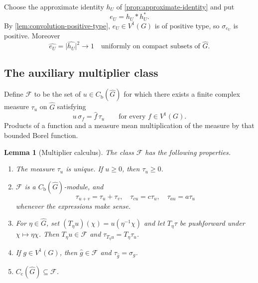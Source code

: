 \documentclass[11pt]{article}
\newtheorem{lemma}[theorem]{Lemma}
\theoremstyle{definition}
\theoremstyle{remark}
\newcommand{\Cc}{C_{\mathrm c}}
\newcommand{\Cb}{C_{\mathrm b}}
\newcommand{\dual}[1]{\widehat{#1}}
\newcommand{\abs}[1]{\lvert #1\rvert}
\begin{document}
Choose the approximate identity $h_U$ of \cref{prop:approximate-identity} and put
\begin{equation}
  e_U=h_U*h_U^*.
  \label{eq:positive-approx-identity}
\end{equation}
By \cref{lem:convolution-positive-type}, $e_U\in V^1(G)$ is of positive type, so
$\sigma_{e_U}$ is positive.  Moreover
\begin{equation}
 \widehat{e_U}=\abs{\widehat{h_U}}^2\longrightarrow1
 \quad\text{uniformly on compact subsets of }\dual G.
 \label{eq:positive-approx-transform}
\end{equation}

\subsection{The auxiliary multiplier class}

Define $\mathcal F$ to be the set of $u\in\Cb(\dual G)$ for which there exists a finite
complex measure $\tau_u$ on $\dual G$ satisfying
\begin{equation}
  u\,\sigma_f=\widehat f\,\tau_u
  \qquad\text{for every }f\in V^1(G).
  \label{eq:F-defining}
\end{equation}
Products of a function and a measure mean multiplication of the measure by that bounded
Borel function.

\begin{lemma}[Multiplier calculus]
\label{lem:multiplier-calculus}
The class $\mathcal F$ has the following properties.
\begin{enumerate}[label=(\roman*)]
\item The measure $\tau_u$ is unique.  If $u\geq0$, then $\tau_u\geq0$.
\item $\mathcal F$ is a $\Cb(\dual G)$-module, and
\[
 \tau_{u+v}=\tau_u+\tau_v,\quad
 \tau_{cu}=c\tau_u,\quad
 \tau_{au}=a\tau_u
\]
whenever the expressions make sense.
\item For $\eta\in\dual G$, set
$(T_\eta u)(\chi)=u(\eta^{-1}\chi)$ and let $T_\eta\tau$ be pushforward under
$\chi\mapsto\eta\chi$.  Then
$T_\eta u\in\mathcal F$ and $\tau_{T_\eta u}=T_\eta\tau_u$.
\item If $g\in V^1(G)$, then $\widehat g\in\mathcal F$ and
$\tau_{\widehat g}=\sigma_g$.
\item $\Cc(\dual G)\subseteq\mathcal F$.
\end{enumerate}
\end{lemma}
\end{document}
